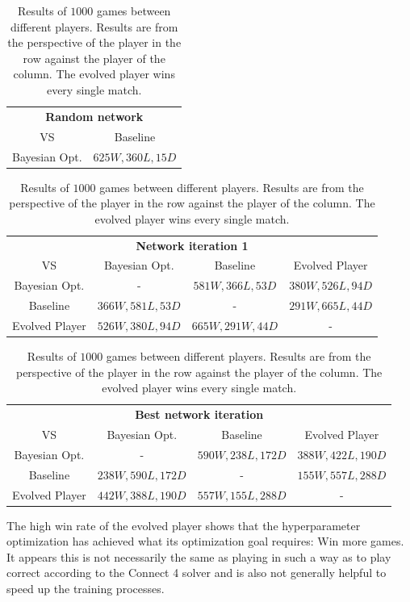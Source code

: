 \documentclass[12pt,onecolumn,oneside,titlepage]{article}
\begin{document}
\begin{table} [H]
 \centering

  \begin{tabular}{ c c }
  \multicolumn{2}{c}{\textbf{Random network}} \\
	      VS & Baseline  \\
  \hline
  Bayesian Opt. & $625W, 360L, 15D$
  \end{tabular}
 
  \begin{tabular}{ c c c c }
  \\
  \multicolumn{4}{c}{\textbf{Network iteration 1}} \\
	      VS & Bayesian Opt. & Baseline & Evolved Player  \\
  \hline
  Bayesian Opt. & - & $581W, 366L, 53D$ & $380W, 526L, 94D$ \\
  Baseline &  $366W, 581L, 53D$ & - & $291W, 665L, 44D$ \\
  Evolved Player & $526W, 380L, 94D$ & $665W, 291W, 44D$ & - \\
  \end{tabular}
  
  \begin{tabular}{ c c c c }
  \\
  \multicolumn{4}{c}{\textbf{Best network iteration}} \\
	      VS & Bayesian Opt. & Baseline & Evolved Player  \\
  \hline
  Bayesian Opt. & - & $590W, 238L, 172D$  & $388W, 422L, 190D$ \\
  Baseline & $238W, 590L, 172D$ & - & $155W, 557L, 288D$  \\
  Evolved Player & $442W, 388L, 190D$ & $557W, 155L, 288D$ & - \\
  \end{tabular}
  
  \caption{Results of $1000$ games between different players. Results are from the perspective of the player in the row against the player of the column. The evolved player wins every single match.}
  \label{t:hyperparam_games}
\end{table}

The high win rate of the evolved player shows that the hyperparameter optimization has achieved what its optimization goal requires: Win more games. It appears this is not necessarily the same as playing in such a way as to play correct according to the Connect 4 solver
and is also not generally helpful to speed up the training processes.
\end{document}
